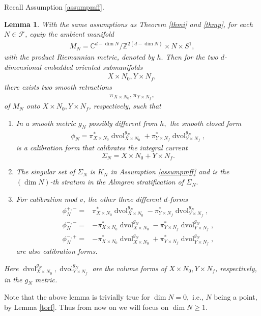 \documentclass[11pt,a4paper]{amsart}
\numberwithin{equation}{section}
\newcommand{\xn}{X\times N_0}
\newcommand{\yn}{Y\times N_f}
\newcommand{\mff}{\mathcal{F}}
\newcommand{\Si}{\Sigma}
\newcommand{\cd}{\cdots}
\newcommand{\dvol}{\operatorname{dvol}}
\newcommand{\du}{^\ast}
\newcommand{\pxn}{\pi_{X\times N_0}}
\newcommand{\pyn}{\pi_{Y\times N_f}}
\newcommand{\dvx}{\dvol_{X\times N_0}^{g_N}}
\newcommand{\dvy}{\dvol_{Y\times N_f}^{g_N}}
\newcommand{\Z}{\mathbb{Z}}
\newcommand{\C}{\mathbb{C}}
\theoremstyle{plain}
\newtheorem{lem}[exam]{Lemma}
\theoremstyle{definition}
\numberwithin{equation}{subsection}
\begin{document}
Recall Assumption \ref{assumpmff}.\begin{lem}
\label{lemr}With the same assumptions as Theorem \ref{thmi} and \ref{thmp}, for each $N\in\mff$, equip the ambient manifold
\begin{align}\label{defnmn}
M_N=\C^{d-\dim N}/\Z^{2(d-\dim N)}\times N\times S^1,
\end{align}with the product Riemannian metric, denoted by $h.$ Then for the two $d$-dimensional embedded oriented submanifolds 
\begin{align*}
X\times N_0, Y\times N_f,
\end{align*} there exists two smooth retractions 
\begin{align*}
\pi_{X\times N_0},\pi_{Y\times N_f},
\end{align*}of $M_N$ 
onto  $X\times N_0, Y\times N_f$, respectively, 
such that
\begin{enumerate}
\item In a smooth metric $g_N$ possibly different from $h,$ the smooth closed form
\begin{align}\label{eqpn1}
\phi_N=\pxn\du\dvx+\pyn\du\dvy,
\end{align}is a calibration form that calibrates the integral current $$\Si_N=X\times N_0+Y\times N_f.$$
\item The singular set of $\Si_N$ is $K_N$ in Assumption \ref{assumpmff} and is the $(\dim N)$-th stratum in the Almgren stratification of $\Si_N.$
\item For calibration mod $v$, the other three different $d$-forms
\begin{align*}	\phi_N^{+,-}=&\pxn\du\dvx-\pyn\du\dvy,\\
		\phi_N^{-,-}=&-\pxn\du\dvx-\pyn\du\dvy,\\
	\phi_N^{-,+}=&-\pxn\du\dvx+\pyn\du\dvy,
\end{align*}are also calibration forms.
\end{enumerate}%
Here $\dvx,\dvy$ are the volume forms of $\xn,\yn$, respectively, in the $g_N$ metric.
\end{lem}
Note that the above lemma is trivially true for $\dim N=0,$ i.e., $N$ being a point, by Lemma \ref{torf}. Thus from now on we will focus on $\dim N\ge 1.$
\end{document}

